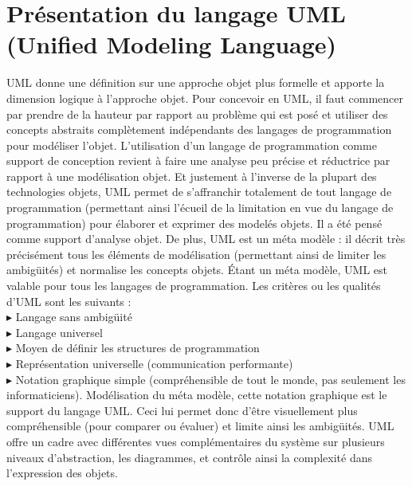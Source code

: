 \documentclass[a4paper, 12pt]{report}
\begin{document}
\section{Présentation du langage UML (Unified Modeling Language)}
\noindent UML donne une définition sur une approche objet plus formelle et apporte la dimension logique à l’approche objet. Pour concevoir en UML, il faut commencer par prendre de la hauteur par rapport au problème qui est posé et utiliser des concepts abstraits complètement indépendants des langages de programmation pour modéliser l’objet. L’utilisation d’un langage de programmation comme support de conception revient à faire une analyse peu précise et réductrice par rapport à une modélisation objet. Et justement à l’inverse de la plupart des technologies objets, UML permet de s’affranchir totalement de tout langage de programmation (permettant ainsi l’écueil de la limitation en vue du langage de programmation) pour élaborer et exprimer des modelés objets. Il a été pensé comme support d’analyse objet.
De plus, UML est un méta modèle : il décrit très précisément tous les éléments de modélisation (permettant ainsi de limiter les ambigüités) et normalise les concepts objets. Étant un méta modèle, UML est valable pour tous les langages de programmation.
Les critères ou les qualités d’UML sont les suivants :
\\
\noindent $\blacktriangleright$ Langage sans ambigüité 
\\
\noindent $\blacktriangleright$ Langage universel
\\
\noindent $\blacktriangleright$ Moyen de définir les structures de programmation
\\
\noindent $\blacktriangleright$ Représentation universelle (communication performante)    
\\  
\noindent $\blacktriangleright$ Notation graphique simple (compréhensible de tout le monde, pas seulement les  
informaticiens).                                                                                                                                             
Modélisation du méta modèle, cette notation graphique est le support du langage UML. Ceci lui permet donc d’être visuellement plus compréhensible (pour comparer ou évaluer) et limite ainsi les ambigüités. UML offre un cadre avec différentes vues complémentaires du système sur plusieurs niveaux d’abstraction, les diagrammes, et contrôle ainsi la complexité dans l’expression des objets.     
\end{document}

